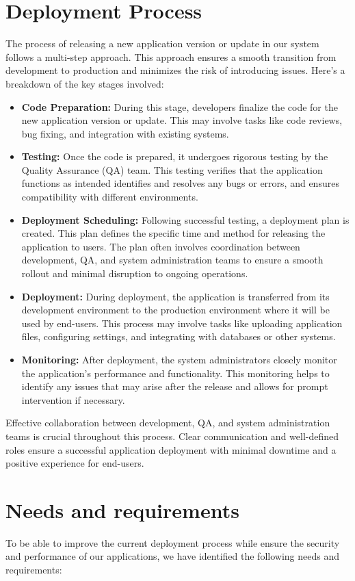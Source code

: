 \section{Deployment Process}
The process of releasing a new application version or update in our system follows a multi-step approach. This approach ensures a smooth transition from development to production and minimizes the risk of introducing issues.
Here's a breakdown of the key stages involved:
\begin{itemize}
    \item \textbf{Code Preparation:} During this stage, developers finalize the code for the new application version or update. This may involve tasks like code reviews, bug fixing, and integration with existing systems.
    \item \textbf{Testing:} Once the code is prepared, it undergoes rigorous testing by the Quality Assurance (QA) team. This testing verifies that the application functions as intended identifies and resolves any bugs or errors, and ensures compatibility with different environments.
    \item \textbf{Deployment Scheduling:} Following successful testing, a deployment plan is created. This plan defines the specific time and method for releasing the application to users. The plan often involves coordination between development, QA, and system administration teams to ensure a smooth rollout and minimal disruption to ongoing operations.
    \item \textbf{Deployment:} During deployment, the application is transferred from its development environment to the production environment where it will be used by end-users. This process may involve tasks like uploading application files, configuring settings, and integrating with databases or other systems.
    \item \textbf{Monitoring:} After deployment, the system administrators closely monitor the application's performance and functionality. This monitoring helps to identify any issues that may arise after the release and allows for prompt intervention if necessary.
\end{itemize}
Effective collaboration between development, QA, and system administration teams is crucial throughout this process. Clear communication and well-defined roles ensure a successful application deployment with minimal downtime and a positive experience for end-users.

\section{Needs and requirements}
To be able to improve the current deployment process while ensure the security and performance of our applications, we have identified the following needs and requirements:
\noindent
